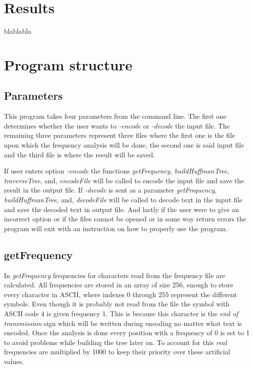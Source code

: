 \documentclass[a4paper,11pt,twoside]{article}
\begin{document}
\section{Results}
blablabla

\section{Program structure}
\subsection{Parameters}
This program takes four parameters from the command line. The first one determines whether the 
user wants to \emph{-encode} or \emph{-decode} the input file. The remaining three parameters represent 
three files where the first one is the file upon which the frequency analysis will be done, the second one is said 
input file and the third file is where the result will be saved. 

If user enters option \emph{-encode} the functions \emph{getFrequency}, \emph{buildHuffmanTree}, \emph{traverseTree}, and, \emph{encodeFile} will be called to encode the input file and save the result in the output file. If \emph{-decode} is sent as a parameter \emph{getFrequency}, \emph{buildHuffmanTree}, and, \emph{decodeFile} will be called to decode text in the input file and save the decoded text in output file. And lastly if the user were to give an incorrect option or if the files cannot be opened or in some way return errors the program will exit with an instruction on how to properly use the program.

\subsection{getFrequency}
In \emph{getFrequency}  frequencies for characters read from the frequency file are calculated.
All frequencies are stored in an array of size 256, enough to store every character in ASCII, where indexes 0 through 255 
represent the different symbols. Even though it is probably not read from the file the symbol with ASCII code 4 is given frequency 1. This is because this character is the \emph{end of transmission} sign which will be written during encoding no matter what text is encoded. Once the analysis is done every position with a frequency of 0 is set to 1 to avoid problems while
building the tree later on. To account for this \emph{real} frequencies are multiplied by 1000 to keep their priority over these artificial values.
\end{document}
